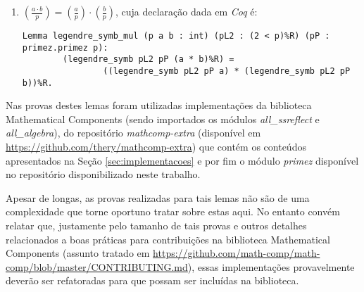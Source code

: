 \begin{enumerate}

        
        \item $\left(\frac{a \cdot b}{p}\right) = \left(\frac{a}{p}\right) \cdot \left(\frac{b}{p}\right)$, cuja declaração dada em \textit{Coq} é:
        \newline
                \begin{lstlisting}[language=coq,frame=single,tabsize=1]
Lemma legendre_symb_mul (p a b : int) (pL2 : (2 < p)%R) (pP : primez.primez p):
        (legendre_symb pL2 pP (a * b)%R) = 
                ((legendre_symb pL2 pP a) * (legendre_symb pL2 pP b))%R.
                \end{lstlisting}
        \end{enumerate}

        Nas provas destes lemas foram utilizadas implementações da biblioteca Mathematical Components (sendo importados os módulos \textit{all\_ssreflect} e \textit{all\_algebra}), do repositório \textit{mathcomp-extra} (disponível em \url{https://github.com/thery/mathcomp-extra}) que contém os conteúdos apresentados na Seção \ref{sec:implementacoes} e por fim o módulo \textit{primez} disponível no repositório disponibilizado neste trabalho.

        Apesar de longas, as provas realizadas para tais lemas não são de uma complexidade que torne oportuno tratar sobre estas aqui. No entanto convém relatar que, justamente pelo tamanho de tais provas e outros detalhes relacionados a boas práticas para contribuições na biblioteca Mathematical Components (assunto tratado em \url{https://github.com/math-comp/math-comp/blob/master/CONTRIBUTING.md}), essas implementações provavelmente deverão ser refatoradas para que possam ser incluídas na biblioteca.


